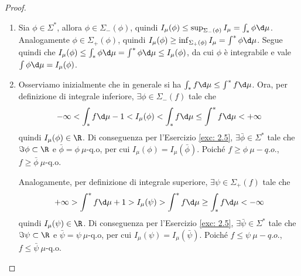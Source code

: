 \begin{proof}~
    \begin{enumerate}
        \item Sia $\phi\in \Sigma^*$, allora $\phi \in \Sigma_-(\phi)$, quindi $I_\mu(\phi)\leq \sup_{\Sigma_-(\phi)}I_\mu = \int_*\phi\d \mu$. Analogamente $\phi \in \Sigma_+(\phi)$, quindi $I_\mu(\phi)\geq \inf_{\Sigma_+(\phi)}I_\mu = \int^*\phi\d \mu$. 
        Segue quindi che $I_\mu(\phi) \leq \int_*\phi\d \mu = \int^*\phi\d \mu \leq I_\mu(\phi)$, da cui $\phi$ è integrabile e vale $\int\phi\d \mu = I_\mu(\phi)$.
        \item Osserviamo inizialmente che in generale si ha $\int_*f\d \mu\leq \int^* f\d \mu$. Ora, per definizione di integrale inferiore, $\exists \phi \in \Sigma_-(f)$ tale che 
        \[-\infty<\int_*f\d\mu-1<I_\mu(\phi)<\int_*f\d\mu\leq \int^* f\d\mu<+\infty\]
        quindi $I_\mu(\phi)\in\R$. Di conseguenza per l'Esercizio \ref{exc: 2.5}, $\exists \bar\phi\in \Sigma^*$ tale che $\Im \phi\subset \R$ e $\bar \phi = \phi\ \mu$-q.o, per cui $I_\mu(\phi)=I_\mu(\bar\phi)$. Poiché $f\geq \phi\ \mu-q.o.$, $f\geq \bar \phi\ \mu$-q.o.

        Analogamente, per definizione di integrale superiore, $\exists \psi \in \Sigma_+(f)$ tale che 
        \[+\infty>\int^*f\d\mu+1>I_\mu(\psi)>\int^*f\d\mu\geq \int_* f\d\mu<-\infty\]
        quindi $I_\mu(\psi)\in\R$. Di conseguenza per l'Esercizio \ref{exc: 2.5}, $\exists\bar \psi\in \Sigma^*$ tale che $\Im \psi\subset \R$ e $\bar \psi = \psi\ \mu$-q.o, per cui $I_\mu(\psi)=I_\mu(\bar\psi)$. Poiché $f\leq \psi\ \mu-q.o.$, $f\leq \bar \psi\ \mu$-q.o.


\end{enumerate}
\end{proof}
